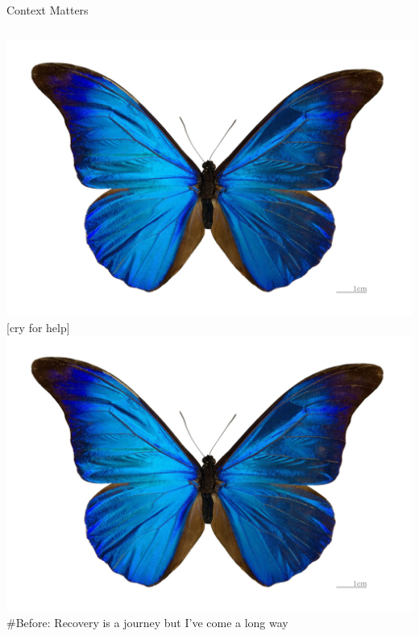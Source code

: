 \documentclass[nobackground,dvipsnames,table,aspectratio=169]{beamer}
\begin{document}
\begin{frame}{Context Matters}
    \begin{columns}[T]
            \includegraphics[width=\textwidth]{butterfly}
            [cry for help]
            \includegraphics[width=\textwidth]{butterfly}
            \#Before: Recovery is a journey but I've come a long way
    \end{columns}    
\end{frame}
\end{document}

